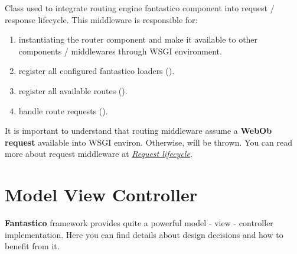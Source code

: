 \documentclass[letterpaper,10pt,english]{sphinxmanual}
\begin{document}
\begin{fulllineitems}
\label{features/routing_engine:fantastico.middleware.routing_middleware.RoutingMiddleware}
Class used to integrate routing engine fantastico component into request / response lifecycle. This middleware is 
responsible for:
\begin{enumerate}
\item {} 
instantiating the router component and make it available to other components / middlewares through WSGI environment.

\item {} 
register all configured fantastico loaders ({\hyperref[features/routing_engine:fantastico.routing_engine.router.Router.get_loaders]{}}).

\item {} 
register all available routes ({\hyperref[features/routing_engine:fantastico.routing_engine.router.Router.register_routes]{}}).

\item {} 
handle route requests ({\hyperref[features/routing_engine:fantastico.routing_engine.router.Router.handle_route]{}}).

\end{enumerate}

It is important to understand that routing middleware assume a \textbf{WebOb request} available into WSGI environ. Otherwise, 
{\hyperref[features/exceptions:fantastico.exceptions.FantasticoNoRequestError]{}} will be thrown. You can read more about request middleware 
at {\hyperref[features/request_response::doc]{\emph{Request lifecycle}}}.

\end{fulllineitems}



\section{Model View Controller}
\label{features/mvc:model-view-controller}\label{features/mvc::doc}
\textbf{Fantastico} framework provides quite a powerful model - view - controller implementation. Here you can find details about
design decisions and how to benefit from it.
\end{document}
